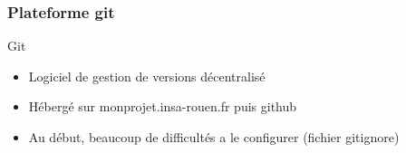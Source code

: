 
\begin{frame}
    \frametitle{Plateforme git}
    		\begin{block}{Git}
    			\begin{itemize}
    				\item Logiciel de gestion de versions décentralisé
    				\item Hébergé sur monprojet.insa-rouen.fr puis github
    				\item Au début, beaucoup de difficultés a le configurer (fichier gitignore) 
    			\end{itemize}
    		\end{block}
  

\end{frame}